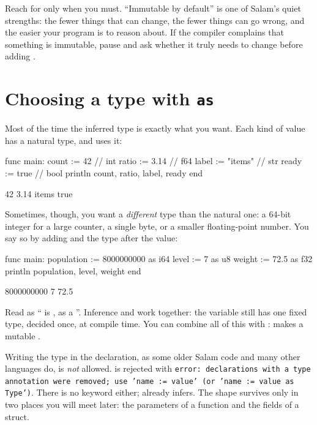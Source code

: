 \begin{tip}
Reach for  only when you must. ``Immutable by default'' is one of
Salam's quiet strengths: the fewer things that can change, the fewer things can
go wrong, and the easier your program is to reason about. If the compiler
complains that something is immutable, pause and ask whether it truly needs to
change before adding .
\end{tip}

\section{Choosing a type with \texttt{as}}

Most of the time the inferred type is exactly what you want. Each kind of value
has a natural type, and \code{:=} uses it:

\begin{salamen}
func main:
    count := 42          // int
    ratio := 3.14        // f64
    label := "items"     // str
    ready := true        // bool
    println count, ratio, label, ready
end
\end{salamen}

\begin{progout}
42 3.14 items true
\end{progout}

Sometimes, though, you want a \emph{different} type than the natural one: a
64-bit integer for a large counter, a single byte, or a smaller floating-point
number. You say so by adding  and the type after the value:

\begin{salamen}
func main:
    population := 8000000000 as i64
    level := 7 as u8
    weight := 72.5 as f32
    println population, level, weight
end
\end{salamen}

\begin{progout}
8000000000 7 72.5
\end{progout}

\noindent Read  as `` is , as a
''. Inference and  work together: the variable still has one
fixed type, decided once, at compile time. You can combine all of this with
:  makes a mutable .

\begin{warn}
Writing the type in the declaration, as some older Salam code and many other
languages do, is \emph{not} allowed.  is rejected with
\texttt{error: declarations with a type annotation were removed; use 'name := %
value' (or 'name := value as Type')}. There is no  keyword either; %
\code{:=} already infers. The  shape survives only in two places
you will meet later: the parameters of a function and the fields of a struct.
\end{warn}


